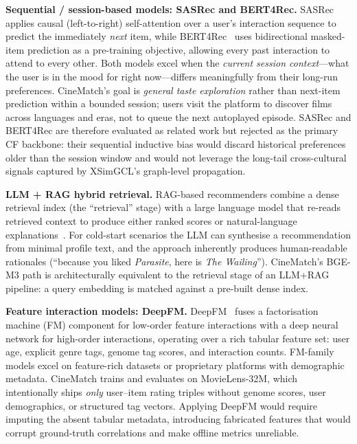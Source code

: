 \documentclass[conference]{IEEEtran}
\begin{document}
\textbf{Sequential / session-based models: SASRec and BERT4Rec.}
SASRec~\cite{sasrec} applies causal (left-to-right) self-attention
over a user's interaction sequence to predict the immediately \emph{next}
item, while BERT4Rec~\cite{bert4rec} uses bidirectional masked-item
prediction as a pre-training objective, allowing every past interaction
to attend to every other.
Both models excel when the \emph{current session context}---what the
user is in the mood for right now---differs meaningfully from their
long-run preferences.
CineMatch's goal is \emph{general taste exploration} rather than
next-item prediction within a bounded session; users visit the platform
to discover films across languages and eras, not to queue the next
autoplayed episode.
SASRec and BERT4Rec are therefore evaluated as related work but rejected
as the primary CF backbone: their sequential inductive bias would
discard historical preferences older than the session window and would
not leverage the long-tail cross-cultural signals captured by
XSimGCL's graph-level propagation.

\textbf{LLM + RAG hybrid retrieval.}
RAG-based recommenders combine a dense retrieval index (the ``retrieval''
stage) with a large language model that re-reads retrieved context to
produce either ranked scores or natural-language explanations~\cite{rag}.
For cold-start scenarios the LLM can synthesise a recommendation
from minimal profile text, and the approach inherently produces
human-readable rationales (``because you liked \emph{Parasite}, here
is \emph{The Wailing}'').
CineMatch's BGE-M3 path is architecturally equivalent to the
retrieval stage of an LLM+RAG pipeline: a query embedding is matched
against a pre-built dense index.

\textbf{Feature interaction models: DeepFM.}
DeepFM~\cite{deepfm} fuses a factorisation machine (FM) component for
low-order feature interactions with a deep neural network for
high-order interactions, operating over a rich tabular feature set:
user age, explicit genre tags, genome tag scores, and interaction
counts.
FM-family models excel on feature-rich datasets or proprietary platforms with
demographic metadata.
CineMatch trains and evaluates on MovieLens-32M, which intentionally
ships \emph{only} user–item rating triples without genome scores,
user demographics, or structured tag vectors.
Applying DeepFM would require imputing the absent tabular metadata,
introducing fabricated features that would corrupt ground-truth
correlations and make offline metrics unreliable.
\end{document}
